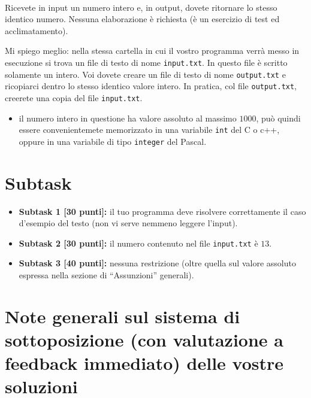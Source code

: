 \renewcommand{\nomebreve}{io\_file}
\renewcommand{\titolo}{Gestire {\bf i}nput ed {\bf o}utput da file}

\mbox{\ }
\vspace{-0.6cm}

\introduzione{}

Ricevete in input un numero intero e,
in output, dovete ritornare lo stesso identico numero. Nessuna elaborazione \`e richiesta (\`e un esercizio di test ed acclimatamento).

Mi spiego meglio:
nella stessa cartella in cui il vostro programma verr\`a messo in esecuzione
si trova un file di testo di nome \texttt{input.txt}.
In questo file \`e scritto solamente un intero.
Voi dovete creare un file di testo di nome \texttt{output.txt}
e ricopiarci dentro lo stesso identico valore intero.
In pratica, col file \texttt{output.txt},
creerete una copia del file \texttt{input.txt}.

   

\begin{itemize}[nolistsep, noitemsep]
  \item il numero intero in questione ha valore assoluto al massimo $1000$,
        pu\`o quindi essere convenientemete memorizzato in una variabile \texttt{int} del C o c++, oppure in una variabile di tipo \texttt{integer} del Pascal.
\end{itemize}
  
  \section*{Subtask}
  \begin{itemize}
    \item \textbf{Subtask 1 [30 punti]:} il tuo programma deve risolvere correttamente il caso d'esempio del testo (non vi serve nemmeno leggere l'input).
    \item \textbf{Subtask 2 [30 punti]:} il numero contenuto nel file \texttt{input.txt} \`e $13$.
    \item \textbf{Subtask 3 [40 punti]:} nessuna restrizione (oltre quella sul valore assoluto espressa nella sezione di ``Assunzioni'' generali).
  \end{itemize}


  \section*{Note generali sul sistema di sottoposizione (con valutazione a feedback immediato) delle vostre soluzioni}

